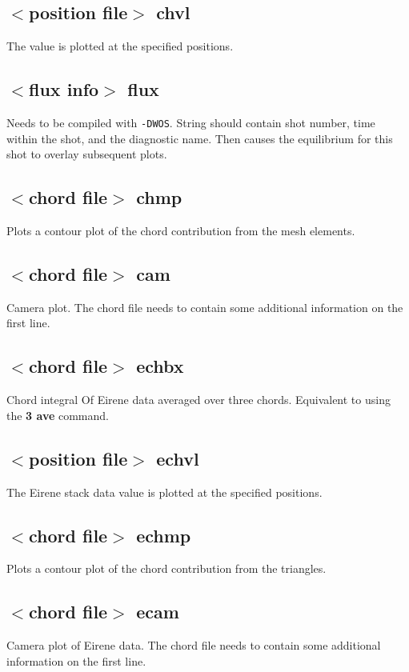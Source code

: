 \documentclass[a4paper,10pt]{report}
\begin{document}
\subsection{$<$position file$>$ chvl}\label{sec:chvl}
The value is plotted at the specified positions.

\subsection{$<$flux info$>$ flux}\label{sec:flux}
Needs to be compiled with {\tt -DWOS}.  String should contain shot number,
time within the shot, and the diagnostic name.  Then causes the
equilibrium for this shot to overlay subsequent plots.

\subsection{$<$chord file$>$ chmp}\label{sec:chmp}
Plots a contour plot of the chord contribution from the mesh elements.

\subsection{$<$chord file$>$ cam}\label{sec:cam}
Camera plot.  The chord file needs to contain some additional
information on the first line.

\subsection{$<$chord file$>$ echbx}\label{sec:echbx}
Chord integral Of Eirene data averaged over three chords. Equivalent to
using the {\bf 3 ave} command.

\subsection{$<$position file$>$ echvl}\label{sec:echvl}
The Eirene stack data value is plotted at the specified positions.

\subsection{$<$chord file$>$ echmp}\label{sec:echmp}
Plots a contour plot of the chord contribution from the triangles.

\subsection{$<$chord file$>$ ecam}\label{sec:ecam}
Camera plot of Eirene data. The chord file needs to contain some additional
information on the first line.
\end{document}
